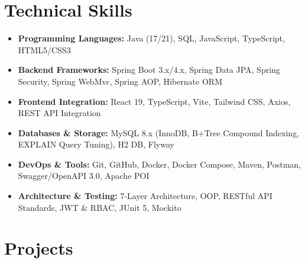 ﻿\documentclass[10pt,a4paper]{article}
\begin{document}
\section{Technical Skills}
\begin{itemize}[leftmargin=1.2em, itemsep=1.8pt, topsep=2pt]
    \item \textbf{Programming Languages:} Java (17/21), SQL, JavaScript, TypeScript, HTML5/CSS3
    \item \textbf{Backend Frameworks:} Spring Boot 3.x/4.x, Spring Data JPA, Spring Security, Spring WebMvc, Spring AOP, Hibernate ORM
    \item \textbf{Frontend Integration:} React 19, TypeScript, Vite, Tailwind CSS, Axios, REST API Integration
    \item \textbf{Databases \& Storage:} MySQL 8.x (InnoDB, B+Tree Compound Indexing, EXPLAIN Query Tuning), H2 DB, Flyway
    \item \textbf{DevOps \& Tools:} Git, GitHub, Docker, Docker Compose, Maven, Postman, Swagger/OpenAPI 3.0, Apache POI
    \item \textbf{Architecture \& Testing:} 7-Layer Architecture, OOP, RESTful API Standards, JWT \& RBAC, JUnit 5, Mockito
\end{itemize}

\section{Projects}
\end{document}
